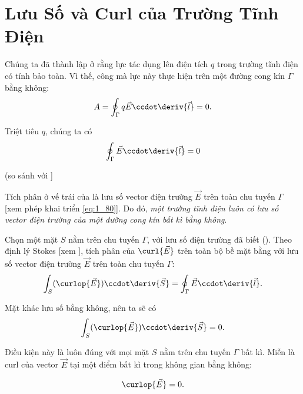 \section{Lưu Số và Curl của Trường Tĩnh Điện}\label{sec:1_12}

Chúng ta đã thành lập ở  rằng lực tác dụng lên điện tích $q$ trong trường tĩnh điện có tính bảo toàn. Vì thế, công mà lực này thực hiện trên một đường cong kín $\Gamma$ bằng không:
\begin{equation*}
	A = \oint_{\Gamma} q\vec{E} \ccdot \deriv{\vec{l}} = 0.
\end{equation*}

\noindent
Triệt tiêu $q$, chúng ta có
\begin{equation}\label{eq:1_110}
	\oint_{\Gamma} \vec{E} \ccdot \deriv{\vec{l}} = 0
\end{equation}

\noindent
(so sánh với ]

Tích phân ở vế trái của  là lưu số vector điện trường $\vec{E}$ trên toàn chu tuyến $\Gamma$ [xem phép khai triển \eqref{eq:1_80}]. Do đó, \textit{một trường tĩnh điện luôn có lưu số vector điện trường của một đường cong kín bất kì bằng không}.

Chọn một mặt $S$ nằm trên chu tuyến $\Gamma$, với lưu số điện trường đã biết (). Theo định lý Stokes [xem ], tích phân của $\curl{\vec{E}}$ trên toàn bộ bề mặt bằng với lưu số vector điện trường $\vec{E}$ trên toàn chu tuyến $\Gamma$:
\begin{equation}\label{eq:1_111}
	\int_S (\curlop{\vec{E}}) \ccdot \deriv{\vec{S}} = \oint_{\Gamma} \vec{E} \ccdot \deriv{\vec{l}}.
\end{equation}

\noindent
Mặt khác lưu số bằng không, nên ta sẽ có
\begin{equation*}
	\int_S (\curlop{\vec{E}}) \ccdot \deriv{\vec{S}} = 0.
\end{equation*}

\noindent
Điều kiện này là luôn đúng với mọi mặt $S$ nằm trên chu tuyến $\Gamma$ bất kì. Miễn là curl của vector $\vec{E}$ tại một điểm bất kì trong không gian bằng không:

\begin{equation}\label{eq:1_112}
	\curlop{\vec{E}} = 0.
\end{equation}

